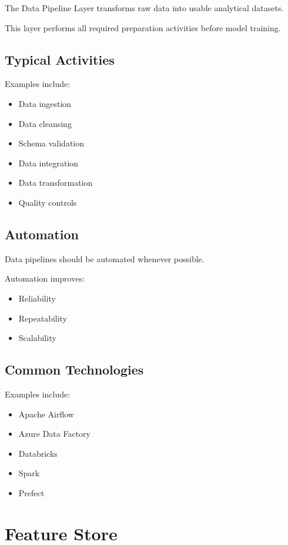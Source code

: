 The Data Pipeline Layer transforms raw data into usable analytical datasets.

This layer performs all required preparation activities before model training.

\subsection{Typical Activities}

Examples include:

\begin{itemize}
    \item Data ingestion
    \item Data cleansing
    \item Schema validation
    \item Data integration
    \item Data transformation
    \item Quality controls
\end{itemize}

\subsection{Automation}

Data pipelines should be automated whenever possible.

Automation improves:

\begin{itemize}
    \item Reliability
    \item Repeatability
    \item Scalability
\end{itemize}

\subsection{Common Technologies}

Examples include:

\begin{itemize}
    \item Apache Airflow
    \item Azure Data Factory
    \item Databricks
    \item Spark
    \item Prefect
\end{itemize}

\section{Feature Store}

